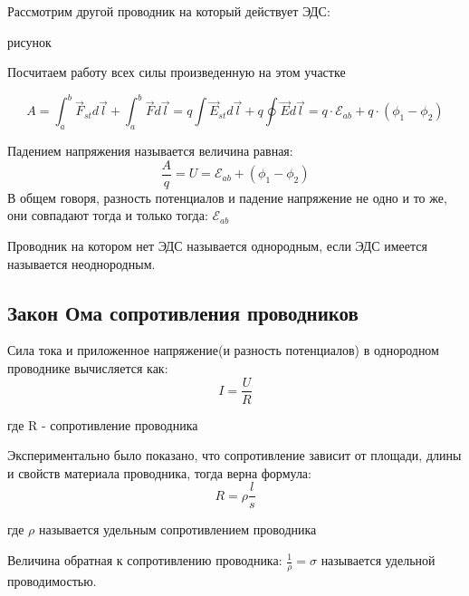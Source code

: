 \documentclass[../main.tex]{subfiles}
\begin{document}
Рассмотрим другой проводник на который действует ЭДС:

рисунок

Посчитаем работу всех силы произведенную на этом участке

\[A = \int_{a}^{b} \vec F_{st} d \vec l + \int_{a}^{b} \vec F d \vec l = q \int \vec E_{st} d \vec l + q \oint \vec E d \vec l = q \cdot \mathscr{E}_{ab} + q \cdot (\phi_1 - \phi_2)\]

 Падением напряжения называется величина равная:
\[\frac{A}{q} = U = \mathscr{E}_{ab} + (\phi_1 - \phi_2)\]
В общем говоря, разность потенциалов и падение напряжение не одно и то же, они совпадают тогда и только тогда: $\mathscr{E}_{ab}$ 

 Проводник на котором нет ЭДС называется однородным, если ЭДС имеется называется неоднородным.

\subsection{Закон Ома сопротивления проводников}

Сила тока и приложенное напряжение(и разность потенциалов) в однородном проводнике вычисляется как:
\[I = \frac{U}{R}\]
\begin{center}
    где R - сопротивление проводника
\end{center}


Экспериментально было показано, что сопротивление зависит от площади, длины и свойств материала проводника, тогда верна формула:
\[R = \rho \frac{l}{s}\]
\begin{center}
    где $\rho$  называется удельным сопротивлением проводника
\end{center}
 Величина обратная к сопротивлению проводника: $\frac{1}{\rho} = \sigma$ называется удельной проводимостью.

\begin{center}


\end{center}
\end{document}
